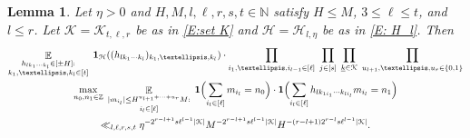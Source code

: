 \documentclass[11pt]{amsart}
\newtheorem{lemma}{Lemma}[section]
\theoremstyle{definition}
\DeclareMathOperator*{\E}{\mathbb{E}}
\newcommand{\N}{{\mathbb N}}
\newcommand{\Z}{{\mathbb Z}}
\newcommand{\CH}{{\mathcal H}}
\newcommand{\CK}{{\mathcal K}}
\newcommand{\uk}{{\underline{k}}}
\newcommand{\Bigbrac}[1]{\Bigl( #1 \Bigr)}
\begin{document}
\begin{lemma}\label{L: bound on pinned solutions}
Let $\eta>0$ and $H, M, l, \ell, r, s, t\in\N$ satisfy $H\leq M$,  $3\leq \ell\leq t$, and $l\leq r$. Let $\CK = \CK_{t, \ell, r}$ be as in \eqref{E:set K} and $\CH = \CH_{l, \eta}$ be as in \eqref{E: H_l}.
Then
    \begin{multline*}
        \E_{\substack{h_{lk_1\cdots k_l}\in[\pm H]:\\ k_1, \ldots, k_l\in[t]}}\; \mathbf{1}_{\CH}((h_{lk_1\cdots k_l})_{k_1, \ldots, k_l})\cdot \prod_{i_1, \ldots, i_{l-1}\in[\ell]}\;\prod_{j\in[s]}\;\prod_{\uk\in\CK}\; \prod_{u_{l+1}, \ldots, u_r\in\{0,1\}}\\ \max_{\substack{n_{0}, n_{1}\in\Z}}\;
        \E_{\substack{|m_{i_l}|\leq H^{u_{l+1}+\cdots + u_r} M:\\ i_l\in[\ell]}}\; \mathbf{1}\Bigbrac{\sum\limits_{i_l\in[\ell]}m_{i_l} = n_0}\cdot
        \mathbf{1}\Bigbrac{\sum\limits_{i_l\in[\ell]}h_{lk_{1i_1}\cdots k_{li_l}}m_{i_l} = n_1}\\
        \ll_{l, \ell, r, s, t}\eta^{-2^{r-l+1}s\ell^{l-1}|\CK|}  M^{-2^{r-l+1}s\ell^{l-1}|\CK|} H^{-(r-l+1)2^{r-l}s\ell^{l-1}|\CK|}.
    \end{multline*}
\end{lemma}
\end{document}
